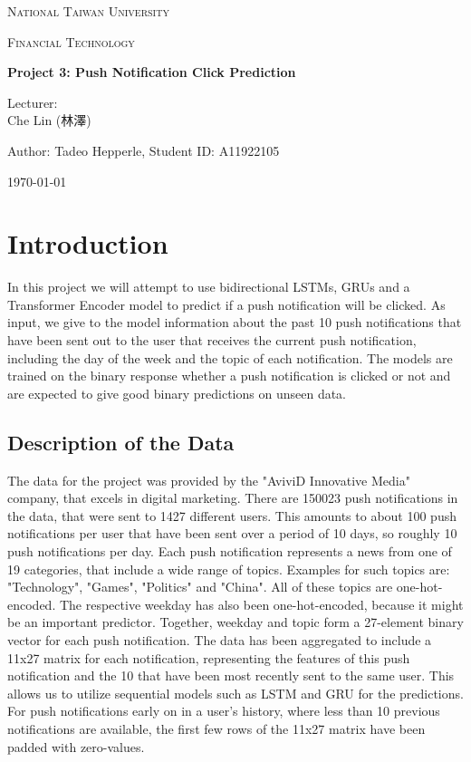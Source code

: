 \documentclass[utf8x]{ctexart}
\begin{document}
\begin{titlepage}
  \centering
  {\scshape\LARGE National Taiwan University \par}
  \vspace{1cm}
  {\scshape\Large Financial Technology \par}
  \vspace{2cm}
  {\huge\bfseries Project 3: Push Notification Click Prediction\par}
  \vspace{2cm}
  {\Large Lecturer:\\
    Che Lin (林澤) \par}
  \vspace{1cm}
  {\Large Author: Tadeo Hepperle, Student ID: A11922105 \par}
  \vfill
  {\large \today\par}
\end{titlepage}


\tableofcontents

\cleardoublepage

\section{Introduction}

In this project we will attempt to use bidirectional LSTMs, GRUs and a Transformer Encoder model to predict if a push notification will be clicked. As input, we give to the model information about the past 10 push notifications that have been sent out to the user that receives the current push notification, including the day of the week and the topic of each notification.
The models are trained on the binary response whether a push notification is clicked or not and are expected to give good binary predictions on unseen data.

\subsection{Description of the Data}

The data for the project was provided by the "AviviD Innovative Media" company, that excels in digital marketing. There are 150023 push notifications in the data, that were sent to 1427 different users. This amounts to about 100 push notifications per user that have been sent over a period of 10 days, so roughly 10 push notifications per day. Each push notification represents a news from one of 19 categories, that include a wide range of topics. Examples for such topics are: "Technology", "Games", "Politics" and "China". All of these topics are one-hot-encoded. The respective weekday has also been one-hot-encoded, because it might be an important predictor. Together, weekday and topic form a 27-element binary vector for each push notification. The data has been aggregated to include a 11x27 matrix for each notification, representing the features of this push notification and the 10 that have been most recently sent to the same user. This allows us to utilize sequential models such as LSTM and GRU for the predictions.
For push notifications early on in a user's history, where less than 10 previous notifications are available, the first few rows of the 11x27 matrix have been padded with zero-values.
\end{document}
